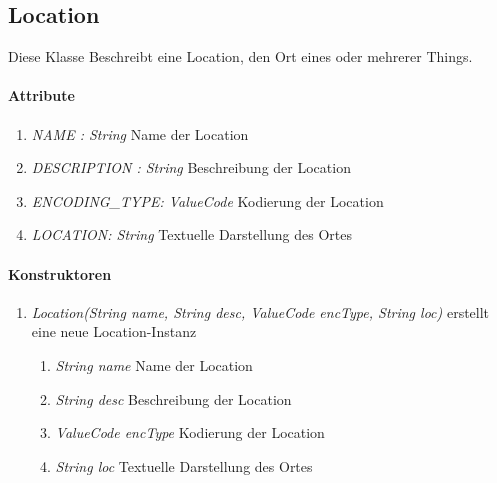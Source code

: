 \subsection{Location}
Diese Klasse Beschreibt eine Location, den Ort eines oder mehrerer Things.

\paragraph{Attribute}
\begin{enumerate}[$\bullet$]
	\item \textit{NAME : String} Name der Location
	\item \textit{DESCRIPTION : String} Beschreibung der Location
	\item \textit{ENCODING\_TYPE: ValueCode} Kodierung der Location
	\item \textit{LOCATION: String} Textuelle Darstellung des Ortes
\end{enumerate}

\paragraph{Konstruktoren}
\begin{enumerate}[+]
	\item \textit{ Location(String name, String desc, ValueCode encType, String loc)}
	erstellt eine neue Location-Instanz
	\begin{enumerate}[$\bullet$]
		\item \textit{String name} Name der Location
		\item \textit{String desc} Beschreibung der Location
		\item \textit{ValueCode encType} Kodierung der Location
		\item \textit{String loc} Textuelle Darstellung des Ortes
	\end{enumerate}
	
\end{enumerate}
